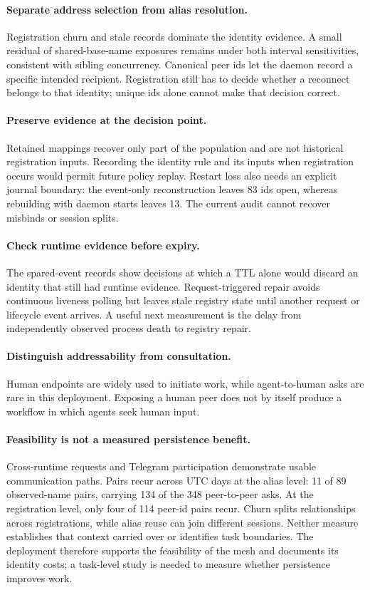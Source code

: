 \documentclass[10pt,twocolumn]{article}
\begin{document}
\paragraph{Separate address selection from alias resolution.}
Registration churn and stale records dominate the identity evidence. A small residual of shared-base-name exposures remains under both interval sensitivities, consistent with sibling concurrency. Canonical peer ids let the daemon record a specific intended recipient. Registration still has to decide whether a reconnect belongs to that identity; unique ids alone cannot make that decision correct.

\paragraph{Preserve evidence at the decision point.}
Retained mappings recover only part of the population and are not historical registration inputs. Recording the identity rule and its inputs when registration occurs would permit future policy replay. Restart loss also needs an explicit journal boundary: the event-only reconstruction leaves 83 ids open, whereas rebuilding with daemon starts leaves 13. The current audit cannot recover misbinds or session splits.

\paragraph{Check runtime evidence before expiry.}
The spared-event records show decisions at which a TTL alone would discard an identity that still had runtime evidence. Request-triggered repair avoids continuous liveness polling but leaves stale registry state until another request or lifecycle event arrives. A useful next measurement is the delay from independently observed process death to registry repair.

\paragraph{Distinguish addressability from consultation.}
Human endpoints are widely used to initiate work, while agent-to-human asks are rare in this deployment. Exposing a human peer does not by itself produce a workflow in which agents seek human input.

\paragraph{Feasibility is not a measured persistence benefit.}
Cross-runtime requests and Telegram participation demonstrate usable communication paths. Pairs recur across UTC days at the alias level: 11 of 89 observed-name pairs, carrying 134 of the 348 peer-to-peer asks. At the registration level, only four of 114 peer-id pairs recur. Churn splits relationships across registrations, while alias reuse can join different sessions. Neither measure establishes that context carried over or identifies task boundaries. The deployment therefore supports the feasibility of the mesh and documents its identity costs; a task-level study is needed to measure whether persistence improves work.
\end{document}
